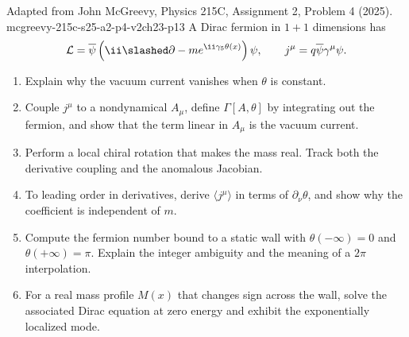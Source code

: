 \begin{enumerate}
  {Adapted from John McGreevy, Physics 215C, Assignment 2, Problem 4 (2025).}
  {mcgreevy-215c-s25-a2-p4-v2ch23-p13}
  A Dirac fermion in \(1+1\) dimensions has
  \[
    \mathcal L
      =\overline\psi\left(\ii\slashed\partial
        -m e^{\ii\gamma_5\theta(x)}\right)\psi ,
    \qquad j^\mu=q\overline\psi\gamma^\mu\psi .
  \]
  \begin{enumerate}
    \item[(a)] Explain why the vacuum current vanishes when \(\theta\) is
      constant.
    \item[(b)] Couple \(j^\mu\) to a nondynamical \(A_\mu\), define
      \(\Gamma[A,\theta]\) by integrating out the fermion, and show that
      the term linear in \(A_\mu\) is the vacuum current.
    \item[(c)] Perform a local chiral rotation that makes the mass real.
      Track both the derivative coupling and the anomalous Jacobian.
    \item[(d)] To leading order in derivatives, derive
      \(\langle j^\mu\rangle\) in terms of \(\partial_\nu\theta\), and show
      why the coefficient is independent of \(m\).
    \item[(e)] Compute the fermion number bound to a static wall with
      \(\theta(-\infty)=0\) and \(\theta(+\infty)=\pi\).  Explain the
      integer ambiguity and the meaning of a \(2\pi\) interpolation.
    \item[(f)] For a real mass profile \(M(x)\) that changes sign across
      the wall, solve the associated Dirac equation at zero energy and
      exhibit the exponentially localized mode.
  \end{enumerate}


\end{enumerate}
